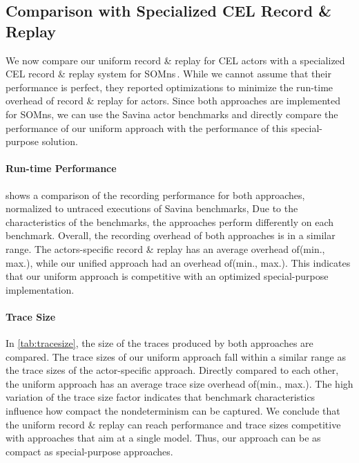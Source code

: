 \documentclass[a4paper,UKenglish,cleveref,autoref]{lipics-v2019}
\newcommand{\citep}[1]{\,\cite{#1}}
\def\SOMns{SOM{\sc ns}\xspace}
\begin{document}
\subsection{Comparison with Specialized CEL Record \& Replay}

We now compare our uniform record \& replay for CEL actors with a specialized CEL record \& replay system for \SOMns\citep{Aumayr:2018:Replay}.
%
%
While we cannot assume that their performance is perfect,
they reported optimizations to minimize the run-time overhead
of record \& replay for actors.
%
Since both approaches are implemented
for \SOMns, we can use the Savina actor benchmarks and directly
compare the performance of our uniform approach
with the performance
of this special-purpose solution.

\paragraph*{Run-time Performance}
 shows a comparison of the recording performance for both approaches,
normalized to untraced executions of Savina benchmarks,
%
Due to the characteristics of the benchmarks,
the approaches perform differently on each benchmark.
%
Overall, the recording overhead of both approaches
is in a similar range.
%
The actors-specific record \& replay 
has an average overhead of\SavinaOldAvgOverheadP (min.\SavinaOldMinOverheadP, max.\SavinaOldMaxOverheadP),
while our unified approach
had an overhead of\SavinaAvgOverheadP (min.\SavinaMinOverheadP, max.\SavinaMaxOverheadP).
This indicates that our uniform approach
is competitive with an optimized special-purpose implementation.

\paragraph*{Trace Size}
\label{sec:eval-trace-size}

In \cref{tab:tracesize}, the size of the traces produced by both approaches
are compared. 
The trace sizes of our uniform approach
fall within a similar range as the trace sizes of the actor-specific approach.
Directly compared to each other, the uniform approach has an average trace size overhead of\TraceAvgOverheadP (min.\TraceMinOverheadP, max.\TraceMaxOverheadP).
%
The high variation of the trace size factor indicates
that benchmark characteristics
influence how compact the nondeterminism can be captured.
%
We conclude that the uniform record \& replay
can reach performance and trace sizes competitive
with approaches that aim at a single model.
Thus, our approach can be as compact as special-purpose approaches.
\end{document}
